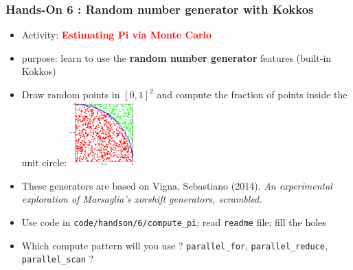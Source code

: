 \begin{frame}[fragile=singleslide]
  \frametitle{Hands-On 6 : Random number generator with Kokkos}

  \begin{itemize}
  \item Activity: \textcolor{red}{\bf Estimating Pi via Monte Carlo}
  \item purpose: learn to use the {\bf random number generator} features (built-in Kokkos)
  \item Draw random points in $[0,1]^2$ and compute the fraction of points inside the unit circle:
    \includegraphics[width=2.5cm]{images/MonteCarloPiMod_gr_25}
  \item These generators are based on Vigna, Sebastiano (2014). {\it An experimental exploration of Marsaglia's xorshift generators, scrambled.} 
  \item Use code in \texttt{code/handson/6/compute\_pi}; read \texttt{readme} file; fill the holes
  \item Which compute pattern will you use ? \texttt{parallel\_for}, \texttt{parallel\_reduce}, \texttt{parallel\_scan} ?
  \end{itemize}
  
\end{frame}


